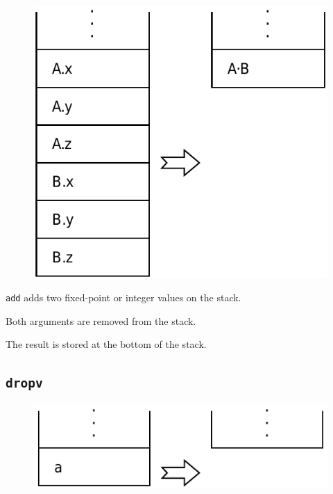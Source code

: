 		\begin{figure}
			\begin{flushright}
				\includegraphics[width=\linewidth]{figure/pdf/i_dot} 
			\end{flushright}
		\end{figure}
	
			\texttt{add} adds two fixed-point or integer values on the stack.
			
			Both arguments are removed from the stack.
			
			The result is stored at the bottom of the stack.
	
	\qquad\qquad
	
	\subsection*{\texttt{dropv}}
	
		\begin{figure}
			\begin{flushright}
				\includegraphics[width=\linewidth]{figure/pdf/i_dropv} 
			\end{flushright}
		\end{figure}

